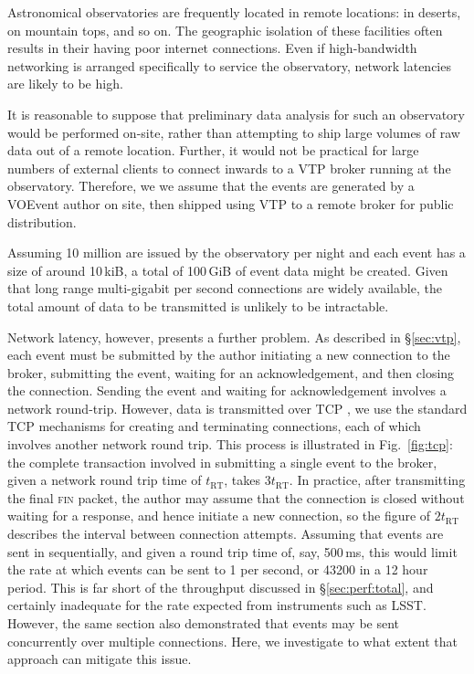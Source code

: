 \documentclass[5p,authoryear]{elsarticle}
\begin{document}
Astronomical observatories are frequently located in remote locations: in
deserts, on mountain tops, and so on. The geographic isolation of these
facilities often results in their having poor internet connections. Even if
high-bandwidth networking is arranged specifically to service the observatory,
network latencies are likely to be high.

It is reasonable to suppose that preliminary data analysis for such an
observatory would be performed on-site, rather than attempting to ship large
volumes of raw data out of a remote location. Further, it would not be
practical for large numbers of external clients to connect inwards to a
VTP broker running at the observatory. Therefore, we we assume that the events
are generated by a VOEvent author on site, then shipped using VTP to a remote
broker for public distribution.

Assuming 10 million are issued by the observatory per night and each event
has a size of around 10\,kiB, a total of 100\,GiB of event data might be
created. Given that long range multi-gigabit per second connections are widely
available, the total amount of data to be transmitted is unlikely to be
intractable.

Network latency, however, presents a further problem. As described in
\S\ref{sec:vtp}, each event must be submitted by the author initiating a new
connection to the broker, submitting the event, waiting for an
acknowledgement, and then closing the connection. Sending the event and
waiting for acknowledgement involves a network round-trip.  However, data is
transmitted over TCP \citep{Cerf:1974}, we use the standard TCP mechanisms for
creating and terminating connections, each of which involves another network
round trip. This process is illustrated in Fig.~\ref{fig:tcp}: the complete
transaction involved in submitting a single event to the broker, given a
network round trip time of $t_\mathrm{RT}$, takes $3 t_\mathrm{RT}$. In
practice, after transmitting the final \textsc{fin} packet, the author may
assume that the connection is closed without waiting for a response, and hence
initiate a new connection, so the figure of $2 t_\mathrm{RT}$ describes the
interval between connection attempts.  Assuming that events are sent in
sequentially, and given a round trip time of, say, 500\,ms, this would limit
the rate at which events can be sent to 1 per second, or 43200 in a 12 hour
period. This is far short of the throughput discussed in
\S\ref{sec:perf:total}, and certainly inadequate for the rate expected from
instruments such as LSST\@.  However, the same section also demonstrated that
events may be sent concurrently over multiple connections. Here, we
investigate to what extent that approach can mitigate this issue.
\end{document}
